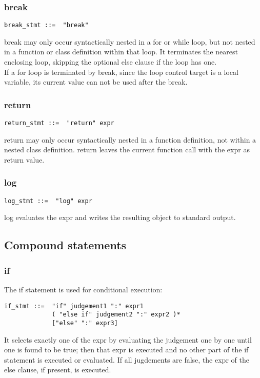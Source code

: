 \documentclass[12pt]{article}
\begin{document}
\subsubsection{break} %
\begin{lstlisting}[caption=break]
break_stmt ::=  "break"
\end{lstlisting}
break may only occur syntactically nested in a for or while loop, but not nested in a function or class definition within that loop. It terminates the nearest enclosing loop, skipping the optional else clause if the loop has one.\\
If a for loop is terminated by break, since the loop control target is a local variable, its current value can not be used after the break.\\

\subsubsection{return} %
\begin{lstlisting}[caption=return]
return_stmt ::=  "return" expr
\end{lstlisting}
return may only occur syntactically nested in a function definition, not within a nested class definition.
return leaves the current function call with the expr as return value.\\

\subsubsection{log} %
\begin{lstlisting}[caption=log]
log_stmt ::=  "log" expr
\end{lstlisting}
log evaluates the expr and writes the resulting object to standard output.\\

\subsection{Compound statements}
\subsubsection{if} %
The if statement is used for conditional execution:
\begin{lstlisting}[caption=if]
if_stmt ::=  "if" judgement1 ":" expr1
             ( "else if" judgement2 ":" expr2 )*
             ["else" ":" expr3]
\end{lstlisting}
It selects exactly one of the expr by evaluating the judgement one by one until one is found to be true; then that expr is executed and no other part of the if statement is executed or evaluated. If all jugdements are false, the expr of the else clause, if present, is executed.
\end{document}
